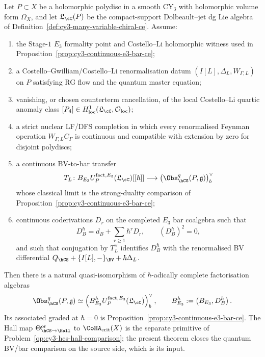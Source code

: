 \begin{theorem}
\label{thm:cy3-quantum-bv-bar-conditional}
Let $P\subset X$ be a holomorphic polydisc in a smooth CY$_3$ with
holomorphic volume form $\Omega_X$, and let
$\mathfrak L_{\cC}(P)$ be the compact-support Dolbeault--jet dg Lie
algebra of Definition~\ref{def:cy3-many-variable-chiral-ce}. Assume:
\begin{enumerate}[label=\textup{(\roman*)}]
\item the Stage-$1$ $E_3$ formality point and Costello--Li holomorphic
witness used in Proposition~\ref{prop:cy3-continuous-e3-bar-ce};
\item a Costello--Gwilliam/Costello--Li renormalisation datum
$(I[L],\Delta_L,W_{\Gamma,L})$ on $P$ satisfying RG flow and the quantum
master equation;
\item vanishing, or chosen counterterm cancellation, of the local
Costello--Li quartic anomaly class
$[P_4]\in H^1_{\mathrm{loc}}
(\mathfrak L_{\cC},\mathcal O_{\mathrm{loc}})$;
\item a strict nuclear LF/DFS completion in which every renormalised
Feynman operation $W_{\Gamma,L}C_\Gamma$ is continuous and compatible
with extension by zero for disjoint polydiscs;
\item a continuous BV-to-bar transfer
\[
 T_L\colon
 B_{E_3}U^{\mathrm{fact},E_3}_P(\mathfrak L_{\cC})[[\hbar]]
 \longrightarrow
 \bigl(\Obs_{\hCS}^{q}(P,\mathfrak g)\bigr)^\vee_b
\]
whose classical limit is the strong-duality comparison of
Proposition~\ref{prop:cy3-continuous-e3-bar-ce};
\item continuous coderivations $D_r$ on the completed $E_3$ bar
coalgebra such that
\[
 D_B^\hbar=d_B+\sum_{r\geq 1}\hbar^rD_r,
 \qquad
 (D_B^\hbar)^2=0,
\]
and such that conjugation by $T_L^\vee$ identifies $D_B^\hbar$ with the
renormalised BV differential
$Q_{\hCS}+\{I[L],-\}_{\BV}+\hbar\Delta_L$.
\end{enumerate}
Then there is a natural quasi-isomorphism of $\hbar$-adically complete
factorisation algebras
\[
 \Obs_{\hCS}^{q}(P,\mathfrak g)
 \simeq
 \left(
 B_{E_3}^{\hbar}
 U^{\mathrm{fact},E_3}_P(\mathfrak L_{\cC})
 \right)^\vee_b ,
 \qquad
 B_{E_3}^{\hbar}:=
 \left(B_{E_3},D_B^\hbar\right).
\]
Its associated graded at $\hbar=0$ is
Proposition~\ref{prop:cy3-continuous-e3-bar-ce}. The Hall map
$\Theta_{\hCS\to\Hall}^{\mathrm{or}}$ to $\CoHA_{\mathrm{crit}}(X)$ is
the separate primitive of
Problem~\ref{op:cy3-hcs-hall-comparison}; the present theorem closes the
quantum BV/bar comparison on the source side, which is its input.
\end{theorem}

